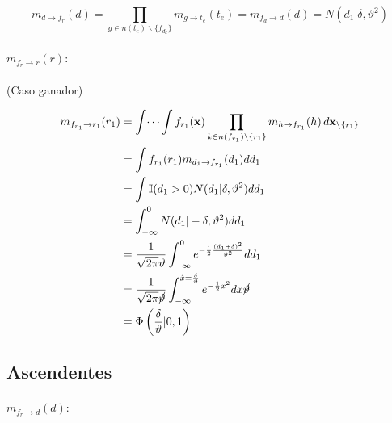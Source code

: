 \documentclass[11pt,twoside,spanish]{report} %
\begin{document}
\begin{equation}
	m_{d \rightarrow f_r}(d) = \prod_{g\in n(t_e)\backslash\{f_{d_k}\}} m_{g \rightarrow t_e} (t_e)
	= m_{f_d \rightarrow d}(d)= N(d_1 \vert \delta, \vartheta^2)
\end{equation}

\paragraph{$m_{f_r \rightarrow r}(r):$} (Caso ganador)

\begin{equation}
	\begin{split}
		m_{f_{r_1} \rightarrow r_1}(r_1) & = \int \dots \int f_{r_1}(\textbf{x}) \prod_{k\in n(f_{r_1})\backslash\{r_1\}} m_{h \rightarrow f_{r_1}}(h) \, d\textbf{x}_{\backslash \{r_1\}} \\
		& = \int f_{r_1}(r_1) m_{d_1 \rightarrow f_{r_1}}(d_1)  dd_1 \\
		& = \int \mathbb{I}(d_1 > 0) N(d_1 \vert \delta, \vartheta^2)  dd_1 \\
		& = \int_{-\infty}^0  N(d_1 \vert -\delta, \vartheta^2)  dd_1 \\
		&=\frac{1}{\sqrt{2\pi}\vartheta} \int_{-\infty}^0e^{-\frac{1}{2}\frac{(d_1+\delta)^2}{ \vartheta^2}}dd_1\\
		&=\frac{1}{\sqrt{2\pi}\cancel{\vartheta}} \int_{-\infty}^{\hat{x}=\frac{\delta}{\vartheta}}e^{-\frac{1}{2}x^2}dx\cancel{\vartheta}\\
		& = \Phi\left(\frac{\delta}{\vartheta}\vert0,1\right)
	\end{split}
\end{equation}







\subsection{\textbf{Ascendentes}}
\label{appendix:mensajesB}
\paragraph{$m_{f_{r}\rightarrow d}(d):$}
\end{document}
